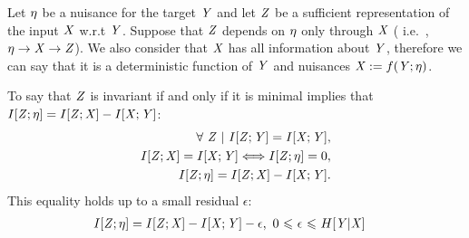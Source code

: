 \begin{theorem} Let $\rvN$ be a nuisance for the target $\rvY$ and let $\rvZ$ be a sufficient representation of the input $\rvX$ w.r.t $\rvY$. Suppose that $\rvZ$ depends on $\rvN$ only through $\rvX$ ( i.e.\ , $\rvN \to \rvX \to \rvZ$). We also consider that $\rvX$ has all information about $\rvY$, therefore we can say that it is a deterministic function of $\rvY$ and nuisances $\rvX:= f(\rvY; \rvN)$.

To say that   $\rvZ$ is invariant if and only if it is minimal implies that $\IZN = \IZX - \IXY$:
\begin{align*}
    \forall~ \rvZ ~|~ \IZY = \IXY, \nonumber\\
    \IZX = \IXY \Longleftrightarrow \IZN = 0, \nonumber\\
    \IZN = \IZX - \IXY.
\end{align*}
This equality holds up to a small residual $\epsilon$:
\begin{align}
	\IZN &= \IZX - \IXY - \epsilon,	~0 \leq \epsilon \leq H[\rvY|\rvX]
\end{align}

\end{theorem}
